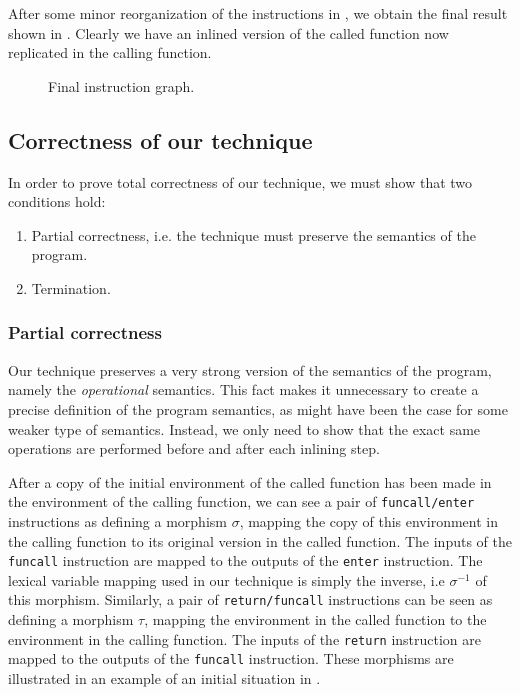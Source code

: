 After some minor reorganization of the instructions in ,
we obtain the final result shown in .  Clearly we have an
inlined version of the called function now replicated in the calling
function.

\begin{figure}
\begin{center}
\end{center}
\caption{\label{fig47}
Final instruction graph.}
\end{figure}

\subsection{Correctness of our technique}
\label{sec-correctness}

In order to prove total correctness of our technique, we must show
that two conditions hold:

\begin{enumerate}
\item Partial correctness, i.e. the technique must preserve the
  semantics of the program.
\item Termination.
\end{enumerate}

\subsubsection{Partial correctness}

Our technique preserves a very strong version of the semantics of the
program, namely the \emph{operational} semantics.  This fact makes
it unnecessary to create a precise definition of the program
semantics, as might have been the case for some weaker type of
semantics.  Instead, we only need to show that the exact same
operations are performed before and after each inlining step.

After a copy of the initial environment of the called function has
been made in the environment of the calling function, we can see a
pair of \texttt{funcall/enter} instructions as defining a morphism
$\sigma$, mapping the copy of this environment in the calling function
to its original version in the called function.  The inputs of the
\texttt{funcall} instruction are mapped to the outputs of the
\texttt{enter} instruction.  The lexical variable mapping used in our
technique is simply the inverse, i.e $\sigma^{-1}$ of this morphism.
Similarly, a pair of \texttt{return/funcall} instructions can be seen
as defining a morphism $\tau$, mapping the environment in the called
function to the environment in the calling function.  The inputs of
the \texttt{return} instruction are mapped to the outputs of the
\texttt{funcall} instruction.  These morphisms are illustrated in an
example of an initial situation in .

